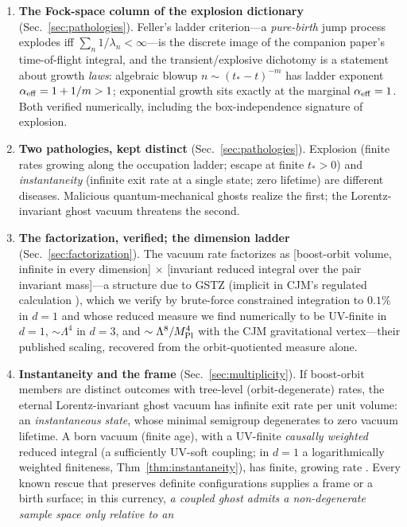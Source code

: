 \documentclass[11pt]{article}
\theoremstyle{definition}
\theoremstyle{remark}
\begin{document}
\begin{enumerate}
\item \textbf{The Fock-space column of the explosion dictionary}
(Sec.~\ref{sec:pathologies}). Feller's ladder criterion---a
\emph{pure-birth} jump process explodes iff $\sum_n 1/\lambda_n<\infty$---is
the discrete image of the companion paper's time-of-flight integral,
and the transient/explosive dichotomy is a statement about growth
\emph{laws}: algebraic blowup $n\sim(t_*-t)^{-m}$ has ladder exponent
$\alpha_{\rm eff}=1+1/m>1$; exponential growth sits exactly at the
marginal $\alpha_{\rm eff}=1$. Both verified numerically, including
the box-independence signature of explosion.
\item \textbf{Two pathologies, kept distinct}
(Sec.~\ref{sec:pathologies}). Explosion (finite rates growing along
the occupation ladder; escape at finite $t_*>0$) and
\emph{instantaneity} (infinite exit rate at a single state; zero
lifetime) are different diseases. Malicious quantum-mechanical ghosts
realize the first; the Lorentz-invariant ghost vacuum threatens the
second.
\item \textbf{The factorization, verified; the dimension ladder}
(Sec.~\ref{sec:factorization}). The vacuum rate factorizes as
[boost-orbit volume, infinite in every dimension] $\times$ [invariant
reduced integral over the pair invariant mass]---a structure due to
GSTZ \cite{GSTZ2021} (implicit in CJM's regulated calculation
\cite{CJM2004}), which we verify by brute-force constrained
integration to $0.1\%$ in $d=1$ and whose reduced measure we find numerically to be
UV-finite in $d=1$, $\sim\Lambda^{4}$ in $d=3$, and
$\sim\Lambda^{8}/M_{\rm Pl}^{4}$ with the CJM gravitational
vertex---their published scaling, recovered from the orbit-quotiented
measure alone.
\item \textbf{Instantaneity and the frame}
(Sec.~\ref{sec:multiplicity}). If boost-orbit members are distinct
outcomes with tree-level (orbit-degenerate) rates, the eternal
Lorentz-invariant ghost vacuum has infinite exit rate per unit
volume: an \emph{instantaneous state}, whose minimal semigroup
degenerates to zero vacuum lifetime. A born vacuum (finite age), with
a UV-finite \emph{causally weighted} reduced integral (a sufficiently
UV-soft coupling; in $d=1$ a logarithmically weighted finiteness,
Thm~\ref{thm:instantaneity}), has finite, growing rate \cite{GV2013}. Every known
rescue that preserves definite configurations supplies a frame or a birth
surface; in this currency, \emph{a
coupled ghost admits a non-degenerate sample space only relative to an
}
\end{enumerate}
\end{document}
